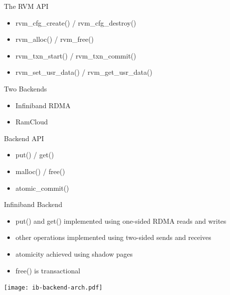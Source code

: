 \documentclass{beamer}
\begin{document}
\begin{frame}{The RVM API}
    \begin{itemize}
        \item rvm\_cfg\_create() / rvm\_cfg\_destroy()
        \item rvm\_alloc() / rvm\_free()
        \item rvm\_txn\_start() / rvm\_txn\_commit()
        \item rvm\_set\_usr\_data() / rvm\_get\_usr\_data()
    \end{itemize}
\end{frame}

\begin{frame}{Two Backends}
    \begin{itemize}
        \item Infiniband RDMA
        \item RamCloud
    \end{itemize}
\end{frame}

\begin{frame}{Backend API}
    \begin{itemize}
        \item put() / get()
        \item malloc() / free()
        \item atomic\_commit()
    \end{itemize}
\end{frame}

\begin{frame}{Infiniband Backend}
    \begin{itemize}
        \item put() and get() implemented using one-sided RDMA reads and writes
        \item other operations implemented using two-sided sends and receives
        \item atomicity achieved using shadow pages
        \item free() is transactional
    \end{itemize}
    \centering
    \texttt{[image: ib-backend-arch.pdf]}
\end{frame}
\end{document}
